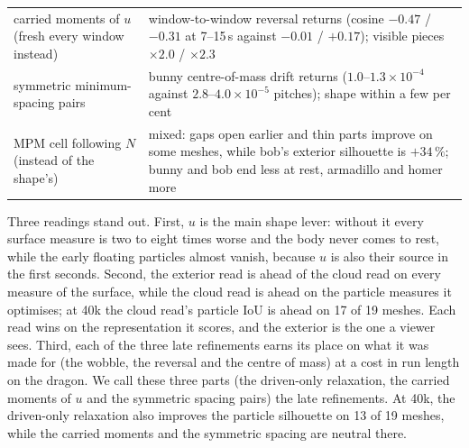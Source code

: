 \begin{table}[t]
\begin{tabular}{p{3.6cm}p{9.8cm}}
carried moments of $u$ (fresh every window instead) & window-to-window reversal returns (cosine $-0.47$ / $-0.31$ at
  7--15\,s against $-0.01$ / $+0.17$); visible pieces $\times2.0$ / $\times2.3$ \\
symmetric minimum-spacing pairs & bunny centre-of-mass drift returns ($1.0$--$1.3\times10^{-4}$ against
  $2.8$--$4.0\times10^{-5}$ pitches); shape within a few per cent \\
MPM cell following $N$ (instead of the shape's) & mixed: gaps open earlier and thin parts improve on some meshes, while
  bob's exterior silhouette is $+34\,\%$; bunny and bob end less at rest, armadillo and homer more \\
\bottomrule
\end{tabular}
\end{table}

Three readings stand out. First, $u$ is the main shape lever: without it every surface measure is two to eight times
worse and the body never comes to rest, while the early floating particles almost vanish, because $u$ is also their
source in the first seconds. Second, the exterior read is ahead of the cloud read on every measure of the surface,
while the cloud read is ahead on the particle measures it optimises; at 40k the cloud read's particle IoU is ahead on 17
of 19 meshes. Each read wins on the representation it scores, and the exterior is the one a viewer sees. Third, each of
the three late refinements earns its place on what it was made for (the wobble, the reversal and the centre of mass)
at a cost in run length on the dragon. We call these three parts (the driven-only
relaxation, the carried moments of $u$ and the symmetric spacing pairs) the late refinements. At 40k, the driven-only relaxation also improves the particle silhouette on 13 of
19 meshes, while the carried moments and the symmetric spacing are neutral there.


